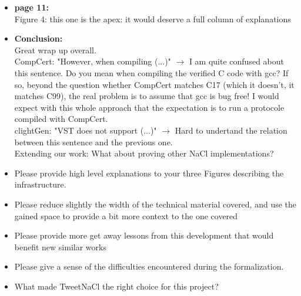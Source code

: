 \begin{itemize}
    \item \textbf{page 11:}\\
          Figure 4: this one is the apex: it would deserve a full column of explanations

    \item \textbf{Conclusion:}\\
          Great wrap up overall.\\
          CompCert: "However, when compiling (...)" $\rightarrow$ I am quite confused about this sentence. Do you mean when compiling the verified C code with gcc? If so, beyond the question whether CompCert matches C17 (which it doesn't, it matches C99), the real problem is to assume that gcc is bug free! I would expect with this whole approach that the expectation is to run a protocole compiled with CompCert.\\
          clightGen: "VST does not support (...)" $\rightarrow$ Hard to undertand the relation between this sentence and the previous one.\\
          Extending our work: What about proving other NaCl implementations?

\end{itemize}

\begin{center}
\end{center}
\begin{itemize}
    \item Please provide high level explanations to your three Figures describing the infrastructure.
    \item Please reduce slightly the width of the technical material covered, and use the gained space to provide a bit more context to the one covered
    \item Please provide more get away lessons from this development that would benefit new similar works
    \item Please give a sense of the difficulties encountered during the formalization.
\end{itemize}

\begin{center}
\end{center}

\begin{itemize}
    \item What made TweetNaCl the right choice for this project?
\end{itemize}

